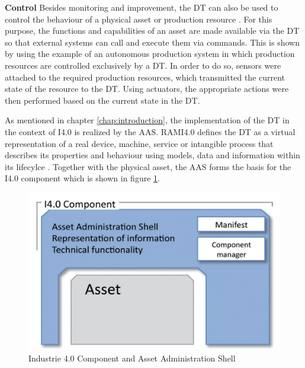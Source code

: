 \begin{itemize}
    \textbf{Control} Besides monitoring and improvement, the \ac{DT} can also be used to control the behaviour of a  physical asset or production resource \cite[p. 15]{Son2021PastManufacturing}. For this purpose, the functions and capabilities of an asset are made available via the \ac{DT} so that external systems can call and execute them via commands. This is shown by \citet[p. 569]{Rosen2015AboutManufacturing} using the example of an autonomous production system in which production resources are controlled exclusively by a \ac{DT}. In order to do so, sensors were attached to the required production resources, which transmitted the current state of the resource to the \ac{DT}. Using actuators, the appropriate actions were then performed based on the current state in the \ac{DT}.
    
\end{itemize}

As mentioned in chapter \ref{chap:introduction}, the implementation of the \ac{DT} in the context of \ac{I4.0} is realized by the \ac{AAS}. \ac{RAMI4.0} defines the \ac{DT} as a virtual representation of a real device, machine, service or intangible process that describes its properties and behaviour using models, data and information within its lifecylce \cite[p. 1]{Stark2020WiGep-PositonTwin}. Together with the physical asset, the \ac{AAS} forms the basis for the \ac{I4.0} component which is shown in figure \ref{fig:i40component}.

\begin{figure}[h]
\centering
\includegraphics[scale=0.8]{content/pictures/i_40_component_zvei.png}
\caption{Industrie 4.0 Component and Asset Administration Shell}
\label{fig:i40component}
\end{figure}

